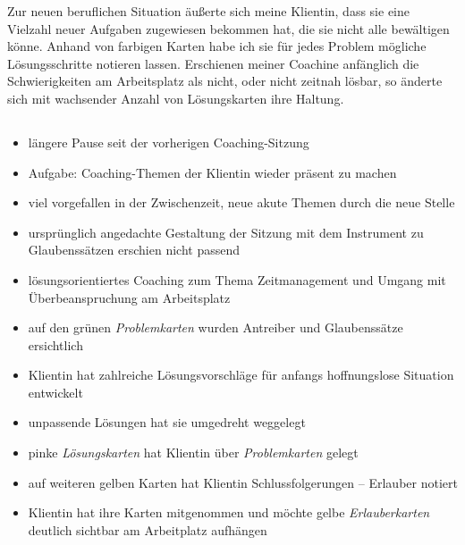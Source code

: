 \documentclass[11pt,a4paper]{article}
\begin{document}
Zur neuen beruflichen Situation äußerte sich meine Klientin, dass sie eine Vielzahl neuer Aufgaben zugewiesen bekommen hat, die sie nicht alle bewältigen könne. Anhand von farbigen Karten habe ich sie für jedes Problem mögliche Lösungsschritte notieren lassen. Erschienen meiner Coachine anfänglich die Schwierigkeiten am Arbeitsplatz als nicht, oder nicht zeitnah lösbar, so änderte sich mit wachsender Anzahl von Lösungskarten ihre Haltung.  


\subsection*{\color{Orange}{Vierte Sitzung: Lösungsorientiertes Coaching}}


\begin{itemize}

	
	\item längere Pause seit der vorherigen Coaching-Sitzung
	
	\item Aufgabe: Coaching-Themen der Klientin wieder präsent zu machen
	
	\item viel vorgefallen in der Zwischenzeit, neue akute Themen durch die neue Stelle
	
	\item ursprünglich angedachte Gestaltung der Sitzung mit dem Instrument zu Glaubenssätzen erschien nicht passend
	
	\item lösungsorientiertes Coaching zum Thema Zeitmanagement und Umgang mit Überbeanspruchung am Arbeitsplatz
	
	\item auf den grünen \textsl{Problemkarten} wurden Antreiber und Glaubenssätze ersichtlich
	
	\item Klientin hat zahlreiche Lösungsvorschläge für anfangs hoffnungslose Situation entwickelt
	
	\item unpassende Lösungen hat sie umgedreht weggelegt	
	
	\item pinke \textsl{Lösungskarten} hat Klientin über \textsl{Problemkarten} gelegt
	
	\item auf weiteren gelben Karten hat Klientin Schlussfolgerungen -- Erlauber notiert
	
	\item Klientin hat ihre Karten mitgenommen und möchte gelbe \textsl{Erlauberkarten} deutlich sichtbar am Arbeitplatz aufhängen


\end{itemize}
\end{document}
